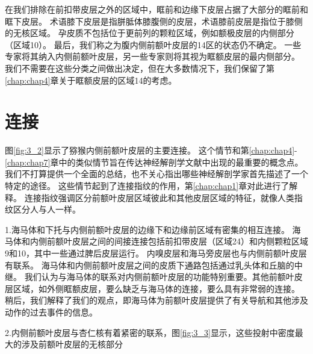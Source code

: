在我们排除在前扣带皮层之外的区域中，眶前和边缘下皮层占据了大部分的眶前和眶下皮层。
术语膝下皮层是指胼胝体膝腹侧的皮层，术语膝前皮层是指位于膝侧的无核区域。
孕皮质不包括位于更前列的颗粒区域，例如额极皮层的内侧部分（区域10）。
最后，我们称之为腹内侧前额叶皮层的14区的状态仍不确定。
一些专家将其纳入内侧前额叶皮层，另一些专家则将其视为眶额皮层的最内侧部分。
我们不需要在这些分类之间做出决定，但在大多数情况下，我们保留了第\ref{chap:chap4}章关于眶额皮层的区域14的考虑。\par



\section{连接}

图\ref{fig:3_2}显示了猕猴内侧前额叶皮层的主要连接。
这个情节和第\ref{chap:chap4}-\ref{chap:chap7}章中的类似情节旨在传达神经解剖学文献中出现的最重要的概念点。
我们不打算提供一个全面的总结，也不关心指出哪些神经解剖学家首先描述了一个特定的途径。
这些情节起到了连接指纹的作用，第\ref{chap:chap1}章对此进行了解释。
连接指纹强调区分前额叶皮层区域彼此和其他皮层区域的特征，就像人类指纹区分人与人一样。\par


1.海马体和下托与内侧前额叶皮层的边缘下和边缘前区域有密集的相互连接\cite{insausti2001cortical}。
海马体和内侧前额叶皮层之间的间接连接包括前扣带皮层（区域24）和内侧颗粒区域9和10，其中一些通过脾后皮层运行\cite{kobayashi2003macaque}。
内嗅皮层和海马旁皮层也与内侧前额叶皮层有联系\cite{kondo2003differential,munoz2005cortical}。
海马体和内侧前额叶皮层之间的皮质下通路包括通过乳头体和丘脑的中继。
我们认为与海马体的联系对内侧前额叶皮层的功能特别重要。其他前额叶皮层区域，如外侧眶额皮层，要么缺乏与海马体的连接，要么具有非常弱的连接\cite{carmichael1995limbic}。
稍后，我们解释了我们的观点，即海马体为前额叶皮层提供了有关导航和其他涉及动作的过去事件的信息。


2.内侧前额叶皮层与杏仁核有着紧密的联系，图\ref{fig:3_3}显示，这些投射中密度最大的涉及前额叶皮层的无核部分\par


